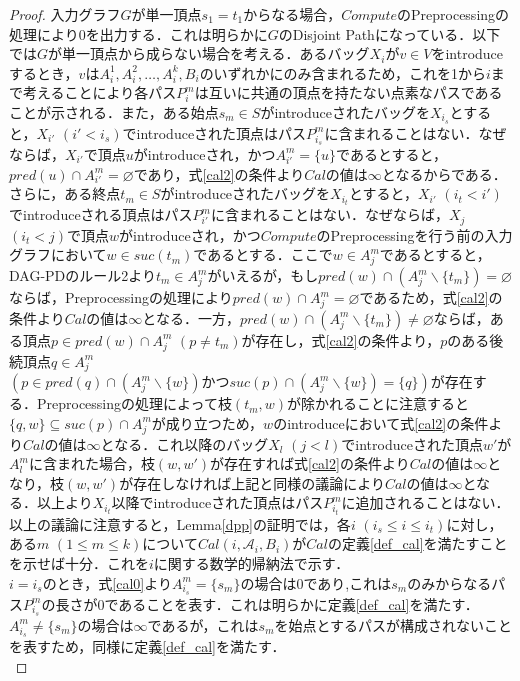 \documentclass[master]{kuisthesis}		%
\theoremstyle{plain}
\theoremstyle{definition}
\begin{document}
\begin{proof}
    入力グラフ$G$が単一頂点$s_1=t_1$からなる場合，$Compute$のPreprocessingの処理により0を出力する．これは明らかに$G$のDisjoint Pathになっている．以下では$G$が単一頂点から成らない場合を考える．あるバッグ$X_i$が$v \in V$をintroduceするとき，$v$は$A^1_i, A^2_i,  \dots, A^k_i, B_i$のいずれかにのみ含まれるため，これを1から$i$まで考えることにより各パス$P^m_i$は互いに共通の頂点を持たない点素なパスであることが示される．また，ある始点$s_m \in S$がintroduceされたバッグを$X_{i_s}$とすると，$X_{i'}$ $(i' < i_s)$でintroduceされた頂点はパス$P^m_{i_s}$に含まれることはない．なぜならば，$X_{i'}$で頂点$u$がintroduceされ，かつ$A^m_{i'} = \{u\}$であるとすると，$pred(u) \cap A^m_{i'} = \varnothing$であり，式\ref{cal2}の条件より$Cal$の値は$\infty$となるからである．さらに，ある終点$t_m \in S$がintroduceされたバッグを$X_{i_t}$とすると，$X_{i'}$ $(i_t < i')$でintroduceされる頂点はパス$P^m_{i'}$に含まれることはない．なぜならば，$X_j$ $(i_t < j)$で頂点$w$がintroduceされ，かつ$Compute$のPreprocessingを行う前の入力グラフにおいて$w \in suc(t_m)$であるとする．ここで$w \in A^m_j$であるとすると，DAG-PDのルール2より$t_m \in A^m_j$がいえるが，もし$pred(w) \cap (A^m_j \backslash \{t_m\}) = \varnothing$ならば，Preprocessingの処理により$pred(w) \cap A^m_j = \varnothing$であるため，式\ref{cal2}の条件より$Cal$の値は$\infty$となる．一方，$pred(w) \cap (A^m_j \backslash \{t_m\}) \neq \varnothing$ならば，ある頂点$p \in pred(w) \cap A^m_j$ $(p \neq t_m)$が存在し，式\ref{cal2}の条件より，$p$のある後続頂点$q \in A^m_j$ $(p \in pred(q) \cap (A^m_j \backslash \{w\}) \text{かつ} suc(p) \cap (A^m_j \backslash \{w\}) = \{q\})$が存在する．Preprocessingの処理によって枝$(t_m, w)$が除かれることに注意すると$\{q, w\} \subseteq suc(p) \cap A^m_j$が成り立つため，$w$のintroduceにおいて式\ref{cal2}の条件より$Cal$の値は$\infty$となる．これ以降のバッグ$X_l$ $(j < l)$でintroduceされた頂点$w'$が$A^m_l$に含まれた場合，枝$(w, w')$が存在すれば式\ref{cal2}の条件より$Cal$の値は$\infty$となり，枝$(w, w')$が存在しなければ上記と同様の議論により$Cal$の値は$\infty$となる．以上より$X_{i_t}$以降でintroduceされた頂点はパス$P^m_{i_t}$に追加されることはない．\\
    以上の議論に注意すると，Lemma\ref{dpp}の証明では，各$i$ $(i_s \leq i \leq i_t)$に対し，ある$m$ $(1 \leq m \leq k)$について$Cal(i, \mathscr{A}_i, B_i)$が$Cal$の定義\ref{def_cal}を満たすことを示せば十分．これを$i$に関する数学的帰納法で示す．\\
    $i=i_s$のとき，式\ref{cal0}より$A^m_{i_s} = \{s_m\}$の場合は0であり,これは$s_m$のみからなるパス$P^m_{i_s}$の長さが0であることを表す．これは明らかに定義\ref{def_cal}を満たす．$A^m_{i_s} \neq \{s_m\}$の場合は$\infty$であるが，これは$s_m$を始点とするパスが構成されないことを表すため，同様に定義\ref{def_cal}を満たす．\\

\end{proof}
\end{document}
